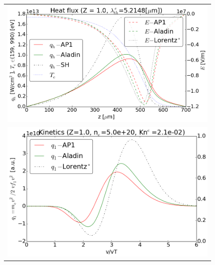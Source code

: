 \begin{figure}[tbh]
  \begin{center}
    \begin{tabular}{c}
      \includegraphics[width=\figscale\textwidth]{../VFPdata/C7_Aladin_case5_heatflux.png} \\
      \includegraphics[width=\figscale\textwidth]{../VFPdata/C7_Aladin_case5_kinetics.png} \\

\end{tabular}
\end{center}
\end{figure}
